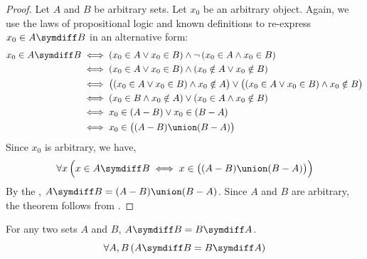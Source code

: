 \begin{proof}
    Let \( A \) and \( B \) be arbitrary sets. Let \( x_{0} \) be an arbitrary object.
    Again, we use the laws of propositional logic and known definitions to re-express
    \( x_{0} \in A \symdiff B \) in an alternative form:
    \begin{align*}
        x_{0} \in A \symdiff B
        &\iff
        \mleft( x_{0} \in A \lor x_{0} \in B \mright)
        \land
        \lnot \, \mleft( x_{0} \in A \land x_{0} \in B \mright)\\
        &\iff
        \mleft( x_{0} \in A \lor x_{0} \in B \mright)
        \land
        \mleft( x_{0} \notin A \lor x_{0} \notin B \mright)\\
        &\iff
        \big( \mleft( x_{0} \in A \lor x_{0} \in B \mright) \land x_{0} \notin A \big)
        \lor
        \big( \mleft( x_{0} \in A \lor x_{0} \in B \mright) \land x_{0} \notin B \big)\\
        &\iff
        \mleft( x_{0} \in B \land x_{0} \notin A \mright)
        \lor
        \mleft( x_{0} \in A \land x_{0} \notin B \mright)\\
        &\iff
        x_{0} \in \mleft( A - B \mright) \lor x_{0} \in \mleft( B - A \mright)\\
        &\iff
        x_{0} \in \big( \mleft( A - B \mright) \union \mleft( B - A \mright) \big)
    \end{align*}
    Since \( x_{0} \) is arbitrary, we have,
    \begin{equation*}
        \forall x \, \Big( x \in A \symdiff B \iff x \in \big( \mleft( A - B \mright) \union \mleft( B - A \mright) \big) \Big)
    \end{equation*}
    By the , \( A \symdiff B = \mleft( A - B \mright) \union \mleft( B - A \mright) \).
    Since \( A \) and \( B \) are arbitrary, the theorem follows from .
\end{proof}

\begin{thm}[Commutativity]
    \label{set-identities:commutativity-of-symmetric-difference}
    For any two sets \( A \) and \( B \), \( A \symdiff B = B \symdiff A \).
    \begin{equation*}
        \forall A,B \, \mleft( A \symdiff B = B \symdiff A \mright)
    \end{equation*}
\end{thm}


